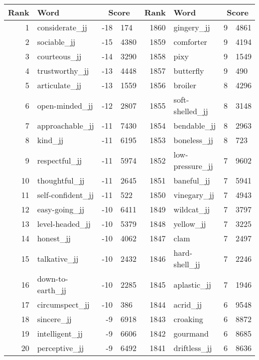 \begin{table}[tbp]
    \begin{tabular}{| rlr@{.}l | rlr@{.}l |}
    \hline
    \textbf{Rank} & \textbf{Word} & \multicolumn{2}{c|}{\textbf{Score}} & \textbf{Rank} & \textbf{Word} & \multicolumn{2}{c|}{\textbf{Score}} \\
    \hline
    1 & considerate\_jj & -18 & 174    &    1860 & gingery\_jj & 9 & 4861 \\
    2 & sociable\_jj & -15 & 4380    &    1859 & comforter & 9 & 4194 \\
    3 & courteous\_jj & -14 & 3290    &    1858 & pixy & 9 & 1549 \\
    4 & trustworthy\_jj & -13 & 4448    &    1857 & butterfly & 9 & 490 \\
    5 & articulate\_jj & -13 & 1559    &    1856 & broiler & 8 & 4296 \\
    6 & open-minded\_jj & -12 & 2807    &    1855 & soft-shelled\_jj & 8 & 3148 \\
    7 & approachable\_jj & -11 & 7430    &    1854 & bendable\_jj & 8 & 2963 \\
    8 & kind\_jj & -11 & 6195    &    1853 & boneless\_jj & 8 & 723 \\
    9 & respectful\_jj & -11 & 5974    &    1852 & low-pressure\_jj & 7 & 9602 \\
    10 & thoughtful\_jj & -11 & 2645    &    1851 & baneful\_jj & 7 & 5941 \\
    11 & self-confident\_jj & -11 & 522    &    1850 & vinegary\_jj & 7 & 4943 \\
    12 & easy-going\_jj & -10 & 6411    &    1849 & wildcat\_jj & 7 & 3797 \\
    13 & level-headed\_jj & -10 & 5379    &    1848 & yellow\_jj & 7 & 3225 \\
    14 & honest\_jj & -10 & 4062    &    1847 & clam & 7 & 2497 \\
    15 & talkative\_jj & -10 & 2432    &    1846 & hard-shell\_jj & 7 & 2246 \\
    16 & down-to-earth\_jj & -10 & 2285    &    1845 & aplastic\_jj & 7 & 1946 \\
    17 & circumspect\_jj & -10 & 386    &    1844 & acrid\_jj & 6 & 9548 \\
    18 & sincere\_jj & -9 & 6918    &    1843 & croaking & 6 & 8872 \\
    19 & intelligent\_jj & -9 & 6606    &    1842 & gourmand & 6 & 8685 \\
    20 & perceptive\_jj & -9 & 6492    &    1841 & driftless\_jj & 6 & 8636 \\

\end{tabular}
\end{table}
